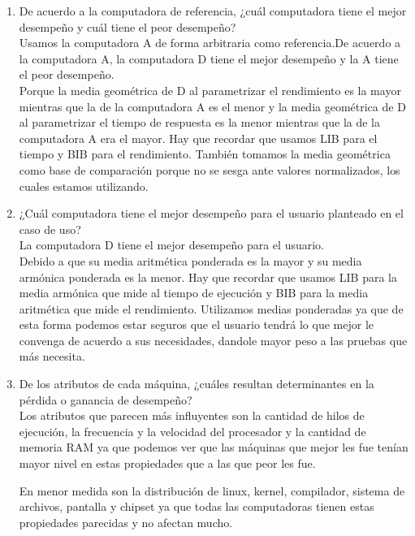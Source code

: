 \documentclass{article}
\begin{document}
\begin{enumerate}
{        }
       
        \item {
        De acuerdo a la computadora de referencia, ¿cuál computadora tiene el
mejor desempeño y cuál tiene el peor desempeño? \\
			Usamos la computadora A de forma arbitraria como referencia.De acuerdo a la computadora A, la computadora D tiene el mejor desempeño y la A tiene el peor desempeño.\\
			
			Porque la media geométrica de D al parametrizar el rendimiento es la mayor mientras que la de la computadora A es el menor y la media geométrica de D al parametrizar el tiempo de respuesta es la menor mientras que la de la computadora A era el mayor. Hay que recordar que usamos LIB para el tiempo y BIB para el rendimiento. También tomamos la media geométrica como base de comparación porque no se sesga ante valores normalizados, los cuales estamos utilizando.\\
        }
        
        \item {
            ¿Cuál computadora tiene el mejor desempeño para el usuario planteado
            en el caso de uso? \\
            La computadora D tiene el mejor desempeño para el usuario.\\
            
          Debido a que su media aritmética ponderada es la mayor y su media armónica ponderada es la menor. Hay que recordar que usamos LIB para la media armónica que mide al tiempo de ejecución y BIB para la media aritmética que mide el rendimiento. Utilizamos medias ponderadas ya que de esta forma podemos estar seguros que el usuario tendrá lo que mejor le convenga de acuerdo a sus necesidades, dandole mayor peso a las pruebas que más necesita.\\
        }
        
        \item {
            De los atributos de cada máquina, ¿cuáles resultan determinantes en 
            la pérdida o ganancia de desempeño? \\
            Los atributos que parecen más influyentes son la cantidad de hilos 
            de ejecución, la frecuencia y la velocidad del procesador y la cantidad de memoria RAM ya que podemos ver que las máquinas que mejor les fue tenían mayor nivel en estas propiedades que a las que peor les fue.
            
            En menor medida son la distribución de linux, kernel, compilador, sistema de archivos, pantalla y chipset ya que todas las computadoras tienen estas propiedades parecidas y no afectan mucho.
        }
    \end{enumerate}
    
\end{document}
